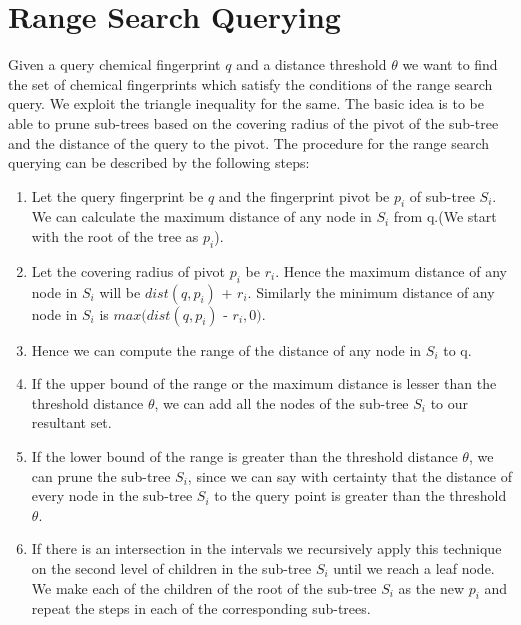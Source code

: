 \section{Range Search Querying}

Given a query chemical fingerprint $q$ and a distance threshold $\theta$ we want to find the set of chemical fingerprints which satisfy the conditions of the range search query. We exploit the triangle inequality for the same. The basic idea is to be able to prune sub-trees based on the covering radius of the pivot of the sub-tree and the distance of the query to the pivot. The procedure for the range search querying can be described by the following steps:\\

\begin{enumerate}
	\item Let the query fingerprint be $q$ and the fingerprint pivot be $p_i$ of sub-tree $S_i$. We can calculate the maximum distance of any node in $S_i$ from q.(We start with the root of the tree as $p_i$).
	
	\item Let the covering radius of pivot $p_i$ be $r_i$. Hence the maximum distance of any node in $S_i$ will be $dist(q,p_i)$ + $r_i$. Similarly the minimum distance of any node in $S_i$ is $max(dist(q,p_i)$ - $r_i, 0)$. 
	
	\item Hence we can compute the range of the distance of any node in $S_i$ to q. 
	
	\item  If the upper bound of the range or the maximum distance is lesser than the threshold distance $\theta$, we can add all the nodes of the sub-tree $S_i$ to our resultant set.
	
	\item If the lower bound of the range is greater than the threshold distance $\theta$, we can prune the sub-tree $S_i$, since we can say with certainty that the distance of every node in the sub-tree $S_i$ to the query point is greater than the threshold $\theta$.
	
	\item If there is an intersection in the intervals we recursively apply this technique on the second level of children in the sub-tree $S_i$ until we reach a leaf node. We make each of the children of the root of the sub-tree $S_i$ as the new $p_i$ and repeat the steps in each of the corresponding sub-trees.
	
\end{enumerate}



